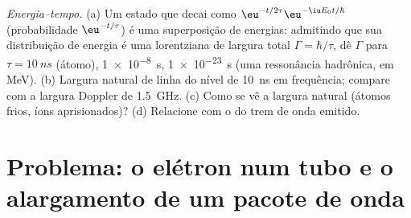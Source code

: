 \begin{exercise}[$\star\star\star$]\label{exo:b2:schrodinger-wave-functions:12}
\emph{Energia--tempo.} (a) Um estado que decai como $\eu^{-t/2\tau}\eu^{-\iu E_0t/\hbar}$
(probabilidade $\eu^{-t/\tau}$) é uma superposição de energias: admitindo
que sua distribuição de energia é uma lorentziana de largura total $\Gamma =
\hbar/\tau$, dê $\Gamma$ para $\tau = \qty{10}{ns}$ (átomo), \qty{1e-8}{s},
\qty{1e-23}{s} (uma ressonância hadrônica, em MeV). (b) Largura natural de
linha do nível de \qty{10}{ns} em frequência; compare com a largura Doppler
de \qty{1.5}{GHz}. (c) Como se vê a largura natural (átomos frios,
íons aprisionados)? (d) Relacione com o  do trem de onda
emitido.
\end{exercise}

\section{Problema: o elétron num tubo e o alargamento de um pacote de onda}

